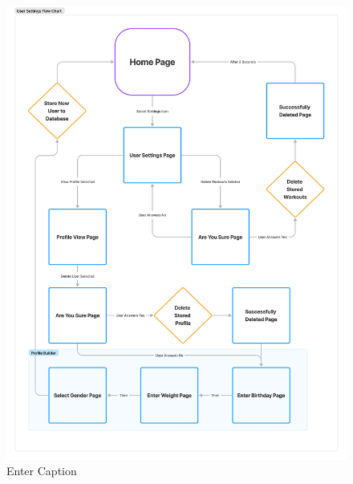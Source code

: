 \documentclass{l4proj}
\begin{document}
\begin{appendices}
\begin{figure}[h!]
    \centering
    \includegraphics[width=0.75\linewidth]{dissertation//dissImages/UserSettingFlow.pdf}
    \caption{Enter Caption}
    \label{fig:enter-label}
\end{figure}

\end{appendices}





\renewcommand{\thechapter}{0}

\end{document}
